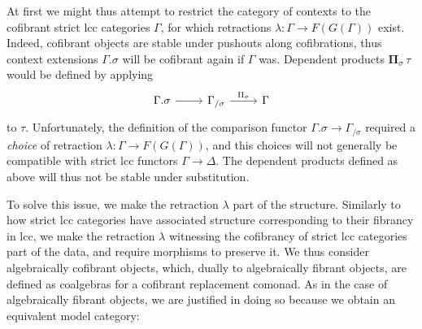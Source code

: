 \documentclass{article}
\theoremstyle{remark}
\theoremstyle{definition}
\begin{document}
At first we might thus attempt to restrict the category of contexts to the cofibrant strict lcc categories $\Gamma$, for which retractions $\lambda : \Gamma \rightarrow F(G(\Gamma))$ exist.
Indeed, cofibrant objects are stable under pushouts along cofibrations, thus context extensions $\Gamma.\sigma$ will be cofibrant again if $\Gamma$ was.
Dependent products $\mathbf{\Pi}_\sigma \, \tau$ would be defined by applying
\begin{equation}
  \begin{tikzcd}
    \Gamma.\sigma \arrow[r] & \Gamma_{/ \sigma} \arrow[r, "\Pi_\sigma"] & \Gamma
  \end{tikzcd}
\end{equation}
to $\tau$.
Unfortunately, the definition of the comparison functor $\Gamma.\sigma \rightarrow \Gamma_{/ \sigma}$ required a \emph{choice} of retraction $\lambda : \Gamma \rightarrow F(G(\Gamma))$, and this choices will not generally be compatible with strict lcc functors $\Gamma \rightarrow \Delta$.
The dependent products defined as above will thus not be stable under substitution.

To solve this issue, we make the retraction $\lambda$ part of the structure.
Similarly to how strict lcc categories have associated structure corresponding to their fibrancy in lcc, we make the retraction $\lambda$ witnessing the cofibrancy of strict lcc categories part of the data, and require morphisms to preserve it.
We thus consider algebraically cofibrant objects, which, dually to algebraically fibrant objects, are defined as coalgebras for a cofibrant replacement comonad.
As in the case of algebraically fibrant objects, we are justified in doing so because we obtain an equivalent model category:
\end{document}
